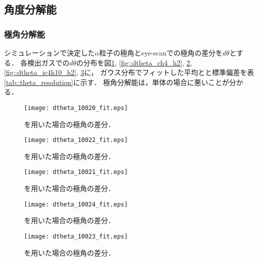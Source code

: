 \documentclass[../master]{subfiles}
\begin{document}
\subsection{角度分解能}
\subsubsection{極角分解能}
シミュレーションで決定した$\alpha$粒子の極角とeye-scanでの極角の差分を$d\theta$とする．
各検出ガスでの$d\theta$の分布を図\ref{fig::dtheta_ch4}, \ref{fig::dtheta_ch4_h2}, \ref{fig::dtheta_ch4_he},
\ref{fig::dtheta_ic4h10_h2}, \ref{fig::dtheta_ic4h10_he}に，
ガウス分布でフィットした平均とと標準偏差を表\ref{tab::theta_resolution}に示す．
極角分解能は，\Methane 単体の場合に悪いことが分かる．
\begin{figure}
  \centering
  \begin{minipage}{0.45\columnwidth}
    \centering
    \texttt{[image: dtheta\_10020\_fit.eps]}
    \caption{\Methane を用いた場合の極角の差分．}
    \label{fig::dtheta_ch4}
  \end{minipage}  
\end{figure}
\begin{figure}
  \centering
  \begin{minipage}{0.45\columnwidth}
    \centering
    \texttt{[image: dtheta\_10022\_fit.eps]}
    \caption{\MethaneHydro を用いた場合の極角の差分．}
    \label{fig::dtheta_ch4_h2}
  \end{minipage}
  \begin{minipage}{0.45\columnwidth}
    \centering
    \texttt{[image: dtheta\_10021\_fit.eps]}
    \caption{\MethaneHerium を用いた場合の極角の差分．}
    \label{fig::dtheta_ch4_he}
  \end{minipage}
\end{figure}
\begin{figure}
  \centering
  \begin{minipage}{0.45\columnwidth}
    \centering
    \texttt{[image: dtheta\_10024\_fit.eps]}
    \caption{\isoButaneHydro を用いた場合の極角の差分．}
    \label{fig::dtheta_ic4h10_h2}
  \end{minipage}
  \begin{minipage}{0.45\columnwidth}
    \centering
    \texttt{[image: dtheta\_10023\_fit.eps]}
    \caption{\isoButaneHerium を用いた場合の極角の差分．}
    \label{fig::dtheta_ic4h10_he}
  \end{minipage}
\end{figure}
\end{document}
